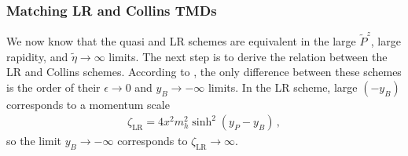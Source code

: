 \documentclass[11pt,a4paper]{article}
\newcommand{\eps}{\epsilon}
\newcommand{\LR}{\mathrm{LR}}
\begin{document}
\subsubsection{Matching LR and Collins TMDs}
\label{sec:qcs}

We now know that the quasi and LR schemes are equivalent in the large $\tilde P^z$, large rapidity, and $\tilde\eta\to\infty$ limits.
The next step is to derive the relation between the LR and Collins schemes.
According to , the only difference between these  schemes is  the order of their $\eps\to0$ and $y_B\to -\infty$ limits. In the LR scheme, large $(-y_B)$ corresponds to a momentum scale
\begin{align} \label{eq:zLR}
	\zeta_\LR =4x^2m_h^2 \sinh^2(y_P-y_B)\,,
\end{align}
so the limit $y_B\to -\infty$ corresponds to $\zeta_\LR\to\infty$.
\end{document}
